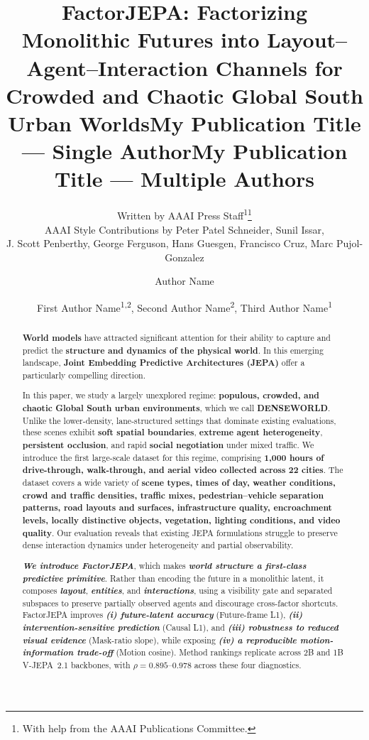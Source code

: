 \documentclass[letterpaper]{article} %
\title{FactorJEPA: Factorizing Monolithic Futures into Layout–Agent–Interaction Channels for Crowded and Chaotic Global South Urban Worlds}
\author{
    Written by AAAI Press Staff\textsuperscript{\rm 1}\thanks{With help from the AAAI Publications Committee.}\\
    AAAI Style Contributions by Peter Patel Schneider,
    Sunil Issar,\\
    J. Scott Penberthy,
    George Ferguson,
    Hans Guesgen,
    Francisco Cruz\equalcontrib\corresponding,
    Marc Pujol-Gonzalez\equalcontrib\corresponding
}
\title{My Publication Title --- Single Author}
\author {
    Author Name
}
\title{My Publication Title --- Multiple Authors}
\author {
    First Author Name\textsuperscript{\rm 1,\rm 2}\equalcontrib,
    Second Author Name\textsuperscript{\rm 2}\equalcontrib,
    Third Author Name\textsuperscript{\rm 1}\corresponding
}
\begin{document}
\maketitle

\begin{abstract}


\textbf{World models} have attracted significant attention for their ability to capture and predict the \textbf{structure and dynamics of the physical world}. In this emerging landscape, \textbf{Joint Embedding Predictive Architectures (JEPA)} offer a particularly compelling direction. 

In this paper, we study a largely unexplored regime: \textbf{populous, crowded, and chaotic Global South urban environments}, which we call \textbf{DENSEWORLD}. Unlike the lower-density, lane-structured settings that dominate existing evaluations, these scenes exhibit \textbf{soft spatial boundaries}, \textbf{extreme agent heterogeneity}, \textbf{persistent occlusion}, and rapid \textbf{social negotiation} under mixed traffic. We introduce the first large-scale dataset for this regime, comprising \textbf{1,000 hours of drive-through, walk-through, and aerial video collected across 22 cities}. The dataset covers a wide variety of \textbf{scene types, times of day, weather conditions, crowd and traffic densities, traffic mixes, pedestrian--vehicle separation patterns, road layouts and surfaces, infrastructure quality, encroachment levels, locally distinctive objects, vegetation, lighting conditions, and video quality}. Our evaluation reveals that existing JEPA formulations struggle to preserve dense interaction dynamics under heterogeneity and partial observability.

\textbf{\emph{We introduce FactorJEPA}}, which makes \textbf{\emph{world structure a first-class predictive primitive}}. Rather than encoding the future in a monolithic latent, it composes \textbf{\emph{layout}}, \textbf{\emph{entities}}, and \textbf{\emph{interactions}}, using a visibility gate and separated subspaces to preserve partially observed agents and discourage cross-factor shortcuts. FactorJEPA improves \textbf{\emph{(i) future-latent accuracy}} (Future-frame L1), \textbf{\emph{(ii) intervention-sensitive prediction}} (Causal L1), and \textbf{\emph{(iii) robustness to reduced visual evidence}} (Mask-ratio slope), while exposing \textbf{\emph{(iv) a reproducible motion-information trade-off}} (Motion cosine). Method rankings replicate across 2B and 1B V-JEPA~2.1 backbones, with $\rho=0.895$--$0.978$ across these four diagnostics.


\end{abstract}
\end{document}
